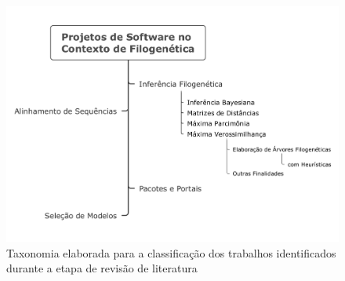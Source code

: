 \documentclass[english,brazilian]{UNISINOSmonografia} %
\newcommand\defaultFigureWidth{0.9}
\begin{document}

\begin{figure}[tb]
	\centering%
	\begin{minipage}{\defaultFigureWidth\textwidth}
		\caption{Taxonomia elaborada para a classificação dos trabalhos identificados durante a etapa de revisão de literatura}
		\label{fig:taxonomia}
		\includegraphics[trim=15 40 15 40,clip,width=\textwidth]{taxonomia}
	\end{minipage}
\end{figure}
\end{document}
